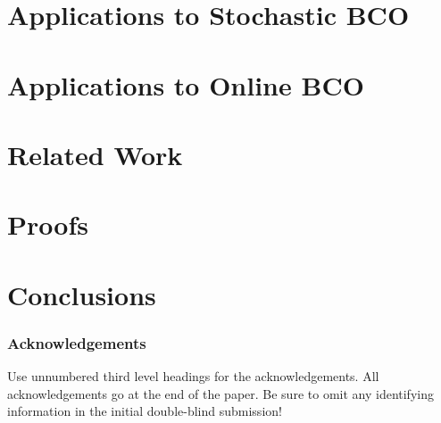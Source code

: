 \documentclass[11pt,letterpaper,english]{article}
\begin{document}
\section{Applications to Stochastic BCO}
\label{sec:sbco}


\section{Applications to Online BCO}
\label{sec:obco}


\section{Related Work}
\label{sec:related}


\section{Proofs}
\label{sec:proofs}
%


% 
%

\section{Conclusions}
\label{sec:conc}






\subsubsection*{Acknowledgements}

Use unnumbered third level headings for the acknowledgements.  All
acknowledgements go at the end of the paper.  Be sure to omit any
identifying information in the initial double-blind submission!
\fi

\end{document}
